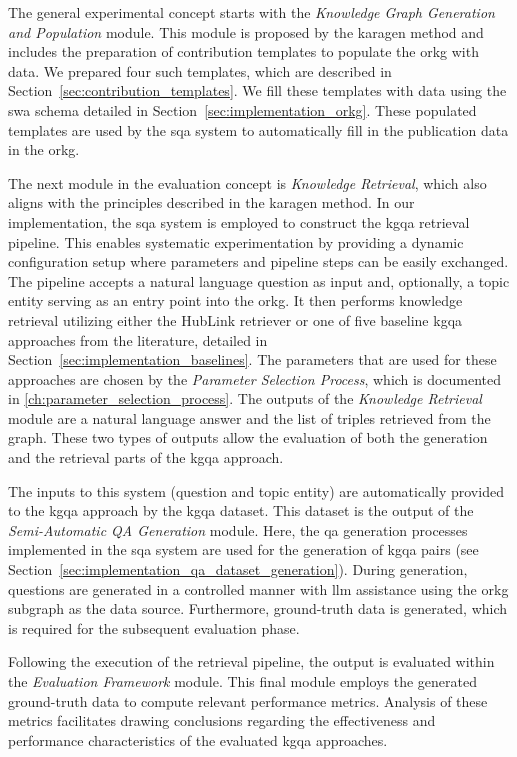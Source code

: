 The general experimental concept starts with the \emph{Knowledge Graph Generation and Population} module. This module is proposed by the \gls{karagen} method and includes the preparation of contribution templates to populate the \gls{orkg} with data. We prepared four such templates, which are described in Section~\ref{sec:contribution_templates}. We fill these templates with data using the \gls{swa} schema detailed in Section~\ref{sec:implementation_orkg}. These populated templates are used by the \gls{sqa} system to automatically fill in the publication data in the \gls{orkg}.

The next module in the evaluation concept is \emph{Knowledge Retrieval}, which also aligns with the principles described in the \gls{karagen} method. In our implementation, the \gls{sqa} system is employed to construct the \gls{kgqa} retrieval pipeline. This enables systematic experimentation by providing a dynamic configuration setup where parameters and pipeline steps can be easily exchanged. The pipeline accepts a natural language question as input and, optionally, a topic entity serving as an entry point into the \gls{orkg}. It then performs knowledge retrieval utilizing either the HubLink retriever or one of five baseline \gls{kgqa} approaches from the literature, detailed in Section~\ref{sec:implementation_baselines}. The parameters that are used for these approaches are chosen by the \emph{Parameter Selection Process}, which is documented in \autoref{ch:parameter_selection_process}. The outputs of the \emph{Knowledge Retrieval} module are a natural language answer and the list of triples retrieved from the graph. These two types of outputs allow the evaluation of both the generation and the retrieval parts of the \gls{kgqa} approach.

The inputs to this system (question and topic entity) are automatically provided to the \gls{kgqa} approach by the \gls{kgqa} dataset. This dataset is the output of the \emph{Semi-Automatic QA Generation} module. Here, the \gls{qa} generation processes implemented in the \gls{sqa} system are used for the generation of \gls{kgqa} pairs (see Section~\ref{sec:implementation_qa_dataset_generation}). During generation, questions are generated in a controlled manner with \gls{llm} assistance using the \gls{orkg} subgraph as the data source. Furthermore, ground-truth data is generated, which is required for the subsequent evaluation phase.

Following the execution of the retrieval pipeline, the output is evaluated within the \emph{Evaluation Framework} module. This final module employs the generated ground-truth data to compute relevant performance metrics. Analysis of these metrics facilitates drawing conclusions regarding the effectiveness and performance characteristics of the evaluated \gls{kgqa} approaches.